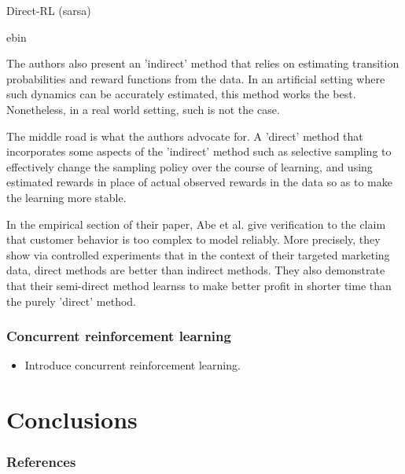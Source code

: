 \documentclass{article} %
\begin{document}
\begin{algorithm}
  \caption{Direct-RL (sarsa) \cite{abe2002empirical}}
  \label{alg:directrl}
  \begin{algorithmic}[1]
    \State ebin
  \end{algorithmic}
\end{algorithm}

The authors also present an 'indirect' method that relies on estimating
transition probabilities and reward functions from the data. In an
artificial setting where such dynamics can be accurately estimated, this method
works the best. Nonetheless, in a real world setting, such is not the case.

The middle road is what the authors advocate for. A 'direct' method that
incorporates some aspects of the 'indirect' method such as selective sampling
to effectively change the sampling policy over the course of learning, and
using estimated rewards in place of actual observed rewards in the data so as
to make the learning more stable.


In the empirical section of their paper, Abe et al. \cite{abe2002empirical}
give verification to the claim that customer behavior is too complex to model
reliably. More precisely, they show via controlled experiments that in the
context of their targeted marketing data, direct methods are better than
indirect methods. They also demonstrate that their semi-direct method learnss to
make better profit in shorter time than the purely 'direct' method.



\subsubsection{Concurrent reinforcement learning}

\begin{itemize}
  \item{Introduce concurrent reinforcement learning.}
\end{itemize}


\section{Conclusions}

\subsubsection*{References}

\printbibliography[heading=none]
\end{document}
